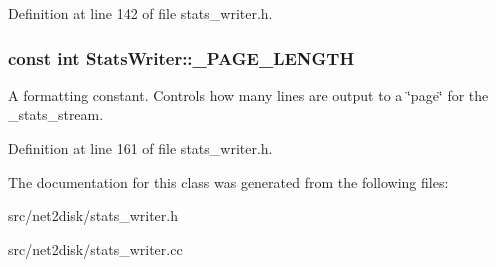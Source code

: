 Definition at line 142 of file stats\_\-writer.h.

\hypertarget{class_stats_writer_a8d6a8784b4517bd4968bb8b04cbbb205}{
\subsubsection[{\_\-PAGE\_\-LENGTH}]{\setlength{\rightskip}{0pt plus 5cm}const int {\bf StatsWriter::\_\-PAGE\_\-LENGTH}}}
\label{class_stats_writer_a8d6a8784b4517bd4968bb8b04cbbb205}
A formatting constant. Controls how many lines are output to a \char`\"{}page\char`\"{} for the \_\-stats\_\-stream. 

Definition at line 161 of file stats\_\-writer.h.



The documentation for this class was generated from the following files:\begin{DoxyCompactItemize}
\item 
src/net2disk/stats\_\-writer.h\item 
src/net2disk/stats\_\-writer.cc\end{DoxyCompactItemize}
